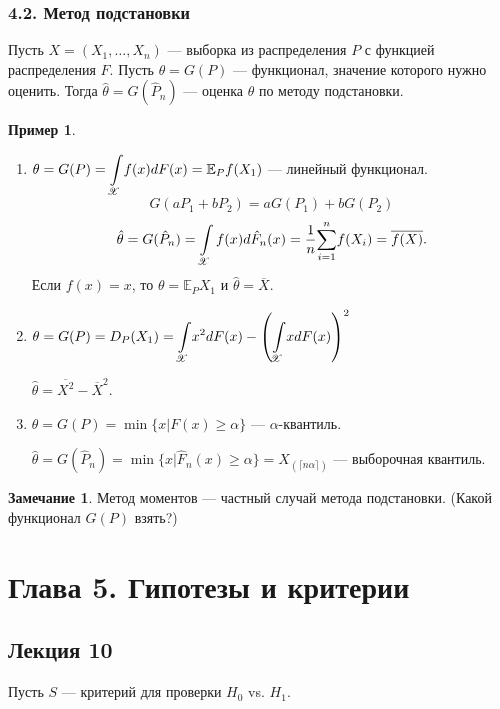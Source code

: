 \documentclass[12pt]{report}
\theoremstyle{definition}
\newtheorem{example}{Пример}
\newtheorem{remark}{Замечание}
\begin{document}
\subsection{4.2. Метод подстановки}
Пусть $X = (X_1, \ldots, X_n)$ — выборка из распределения $P$ с функцией распределения $F$. Пусть $\theta = G(P)$ — функционал, значение которого нужно оценить.
Тогда $\hat{\theta} = G(\hat{P}_n)$ — оценка $\theta$ по методу подстановки.

\begin{example}
	$\;$
	\begin{enumerate}
		\item $\theta = G(P) = \displaystyle{\int\displaylimits_\mathscr{X}} f(x)dF(x) = \mathbb{E}_P f(X_1)$ — линейный функционал.	
		$$G(aP_1 + bP_2) = aG(P_1) + bG(P_2)$$
		$$\hat{\theta} = G(\hat{P}_n) = \int\displaylimits_\mathscr{X} f(x)d\hat{F}_n(x) = \dfrac{1}{n}\displaystyle{\sum_{i=1}^n}f(X_i) = \overline{f(X)}.$$
		Если $f(x) = x$, то $\theta = \mathbb{E}_P X_1$ и $\hat{\theta} = \overline{X}$.
		\item $\theta = G(P) = D_P(X_1) = \displaystyle{\int\displaylimits_\mathscr{X}} x^2dF(x) - \left(\displaystyle{\int\displaylimits_\mathscr{X}} xdF(x)\right)^2$
		
		$\hat{\theta} = \overline{X^2} - \overline{X}^2$.

		\item $\theta = G(P) = \min\{x|F(x) \geqslant \alpha\}$ — $\alpha$-квантиль.
		
		$\hat{\theta} = G(\hat{P}_n) = \min\{x|\hat{F}_n(x) \geqslant \alpha\} = X_{(\lceil n\alpha \rceil)}$ — выборочная квантиль.
	\end{enumerate}
\end{example}
\begin{remark}
	Метод моментов — частный случай метода подстановки. (Какой функционал $G(P)$ взять?)
\end{remark}

\chapter{Глава 5. Гипотезы и критерии}
\section{Лекция 10}
Пусть $S$ — критерий для проверки $H_0$ vs. $H_1$.
\end{document}
